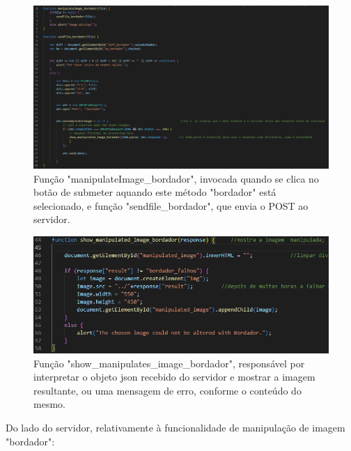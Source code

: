 \documentclass{report}
\begin{document}
\newpage
\begin{figure}[!hbtp]
        \centering
        \includegraphics[scale=0.4]{Images_code/13 - image manipulation js bordador manipulateImage_bordador e sendfile_bordador.png}
        \caption{\label{Estrutura}Função "manipulateImage\_bordador", invocada quando se clica no botão de submeter aquando este método "bordador" está selecionado, e função "sendfile\_bordador", que envia o POST ao servidor.}
\end{figure}

\begin{figure}[!hbtp]
        \centering
        \includegraphics[scale=0.8]{Images_code/13 - image manipulation js bordador show_manipulated_image_bordador.png}
        \caption{\label{Estrutura}Função "show\_manipulates\_image\_bordador", responsável por interpretar o objeto json recebido do servidor e mostrar a imagem resultante, ou uma mensagem de erro, conforme o conteúdo do mesmo.}
\end{figure}

\newpage

    Do lado do servidor, relativamente à funcionalidade de manipulação de imagem "bordador":
\end{document}
